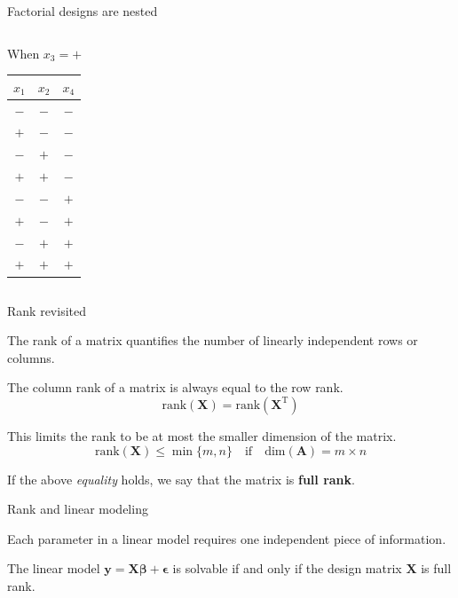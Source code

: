 \documentclass[10pt]{beamer}
\newcommand\lo{\ensuremath{\boldsymbol{-}}}
\newcommand\hi{\ensuremath{\boldsymbol{+}}}
\begin{document}
\begin{frame}{Factorial designs are nested}
\begin{columns}
\begin{column}{0.3\textwidth}
\begin{center}
When $x_3 = \hi$
\medskip
\begin{tabular}{ccc}
$x_1$ & $x_2$ & $x_4$ \\
\hline
\rowcolor{pink} \lo & \lo & \lo \\
\rowcolor{pink} \hi & \lo & \lo \\
\rowcolor{pink} \lo & \hi & \lo \\
\rowcolor{pink} \hi & \hi & \lo \\
\rowcolor{pink} \lo & \lo & \hi \\
\rowcolor{pink} \hi & \lo & \hi \\
\rowcolor{pink} \lo & \hi & \hi \\
\rowcolor{pink} \hi & \hi & \hi \\
\end{tabular}
\end{center}
\end{column}

\end{columns}	
\end{frame}

\begin{frame}{Rank revisited}

The rank of a matrix quantifies the number of linearly independent rows or columns.

\medskip
The column rank of a matrix is always equal to the row rank.
\[ \mathrm{rank}(\mathbf{X}) = \mathrm{rank}(\mathbf{X}^\mathrm{T}) \]

This limits the rank to be at most the smaller dimension of the matrix.
\[ \mathrm{rank}(\mathbf{X}) \le \min\{m,n\} \quad\mathrm{if}\quad \mathrm{dim}(\mathbf{A}) = m\times n \]

If the above \emph{equality} holds, we say that the matrix is \textbf{full rank}.

\end{frame}

\begin{frame}{Rank and linear modeling}

Each parameter in a linear model requires one independent piece of information.

\medskip
The linear model $\mathbf{y} = \mathbf{X}\mathbf{\beta} + \mathbf{\epsilon}$ is solvable if and only if the design matrix $\mathbf{X}$ is full rank.
\end{frame}
\end{document}
